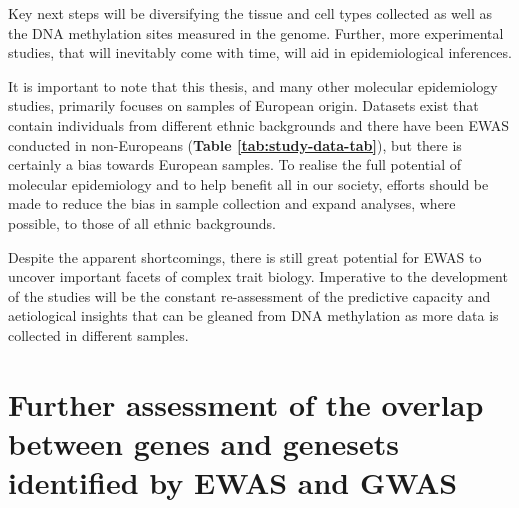 \documentclass[11pt,oneside]{bristolthesis}
\begin{document}
Key next steps will be diversifying the tissue and cell types collected as well as the DNA methylation sites measured in the genome. Further, more experimental studies, that will inevitably come with time, will aid in epidemiological inferences.

It is important to note that this thesis, and many other molecular epidemiology studies, primarily focuses on samples of European origin. Datasets exist that contain individuals from different ethnic backgrounds and there have been EWAS conducted in non-Europeans (\textbf{Table \ref{tab:study-data-tab}}), but there is certainly a bias towards European samples. To realise the full potential of molecular epidemiology and to help benefit all in our society, efforts should be made to reduce the bias in sample collection and expand analyses, where possible, to those of all ethnic backgrounds.

Despite the apparent shortcomings, there is still great potential for EWAS to uncover important facets of complex trait biology. Imperative to the development of the studies will be the constant re-assessment of the predictive capacity and aetiological insights that can be gleaned from DNA methylation as more data is collected in different samples.

\appendix

\hypertarget{further-assessment-of-the-overlap-between-genes-and-genesets-identified-by-ewas-and-gwas}{%
\chapter{Further assessment of the overlap between genes and genesets identified by EWAS and GWAS}\label{further-assessment-of-the-overlap-between-genes-and-genesets-identified-by-ewas-and-gwas}}
\end{document}
